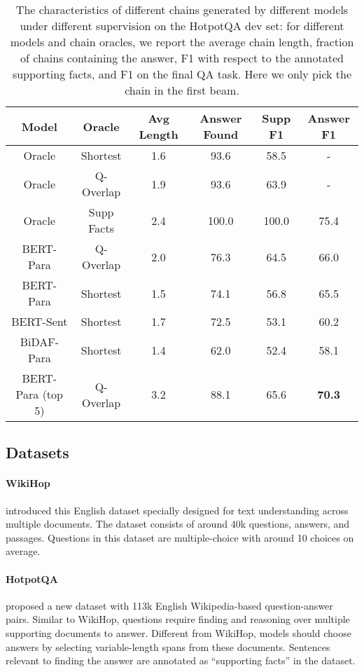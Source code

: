 \documentclass[11pt,a4paper]{article}
\begin{document}
\begin{table*}[t]
\small
\centering
\renewcommand{\tabcolsep}{1.3mm}
\begin{tabular}{c | c | c   c   c  c }
\toprule
Model  & Oracle & Avg Length  & Answer Found & Supp F1 & Answer F1   \\
\midrule
Oracle & Shortest  & 1.6 & 93.6  & 58.5  & - \\
Oracle & Q-Overlap  & 1.9 & 93.6 & 63.9 & - \\
Oracle & Supp Facts & 2.4 & 100.0 & 100.0 & 75.4 \\
\midrule
BERT-Para & Q-Overlap  & 2.0 & 76.3 & 64.5 & 66.0 \\
BERT-Para & Shortest  & 1.5 & 74.1 & 56.8 & 65.5 \\
BERT-Sent & Shortest & 1.7 & 72.5 & 53.1 & 60.2 \\
BiDAF-Para & Shortest  & 1.4 & 62.0 & 52.4 & 58.1 \\
\midrule
BERT-Para (top 5) & Q-Overlap  & 3.2 & 88.1 & 65.6 & \textbf{70.3} \\
\bottomrule


\end{tabular}
\caption{The characteristics of different chains generated by different models under different supervision on the HotpotQA dev set: for different models and chain oracles, we report the average chain length, fraction of chains containing the answer, F1 with respect to the annotated supporting facts, and F1 on the final QA task. Here we only pick the chain in the first beam.}
\vspace{-0.5cm}
\label{tab:chain_model_statistics}
\end{table*}

\subsection{Datasets}

\paragraph{WikiHop} \citet{welbl2018constructing} introduced this English dataset specially designed for text understanding across multiple documents. The dataset consists of around 40k questions, answers, and passages. Questions in this dataset are multiple-choice with around 10 choices on average.

\paragraph{HotpotQA} \citet{yang2018hotpotqa} proposed a new dataset with 113k English Wikipedia-based question-answer pairs. Similar to WikiHop, questions require finding and reasoning over multiple supporting documents to answer. Different from WikiHop, models should choose answers by selecting variable-length spans from these documents. Sentences relevant to finding the answer are annotated as ``supporting facts'' in the dataset.
\end{document}
